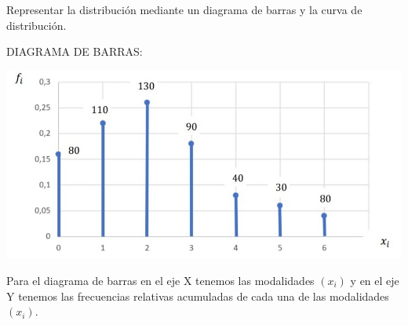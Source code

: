 		

	
\subproblem
Representar la distribución mediante un diagrama de barras y la curva de distribución.

\begin{center}
DIAGRAMA DE BARRAS:
\begin{center}
	\includegraphics[scale=0.5]{grafica-ej-1.jpeg}

\end{center}
Para el diagrama de barras en el eje X tenemos las modalidades $(x_{i})$ y en el eje Y tenemos las frecuencias relativas acumuladas de cada una de las modalidades $(x_{i})$. \\

\end{center}

